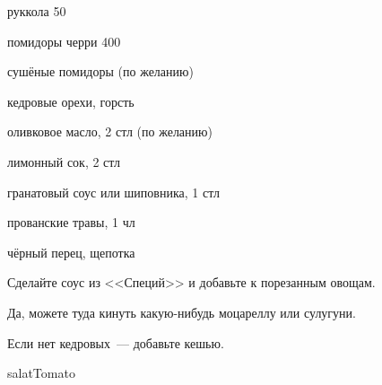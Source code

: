 {\label{arugula}
\item руккола 50
\item помидоры черри 400
\item сушёные помидоры (по желанию)
\item кедровые орехи, горсть
}{
\item оливковое масло, 2 стл (по желанию)
\item лимонный сок, 2 стл
\item гранатовый соус или шиповника, 1 стл
\item прованские травы, 1 чл
\item чёрный перец, щепотка
}{
Сделайте соус из <<Специй>> и добавьте к порезанным овощам.
}{
\begin{advice}
\item Да, можете туда кинуть какую-нибудь моцареллу или сулугуни.
\item Если нет кедровых~--- добавьте кешью.

\end{advice}}{salatTomato}


